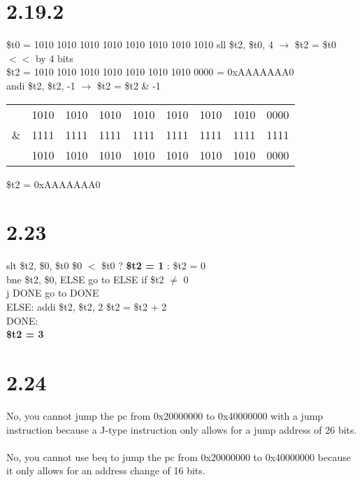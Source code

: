 \documentclass[12pt]{article}
\begin{document}
\section*{2.19.2}
\$t0 = 1010 1010 1010 1010 1010 1010 1010 1010
\newline
\newline
sll \$t2, \$t0, 4 $\rightarrow$ \$t2 = \$t0 $<<$ by 4 bits\\
\$t2 = 1010 1010 1010 1010 1010 1010 1010 0000 = 0xAAAAAAA0\\
\newline
andi \$t2, \$t2, -1 $\rightarrow$ \$t2 = \$t2 \& -1
\newline
\newline
\begin{tabular}{ccccccccc}
	 & 1010 & 1010 & 1010 & 1010 & 1010 & 1010 & 1010 & 0000\\
	\& & 1111 & 1111 & 1111 & 1111 & 1111 & 1111 & 1111 & 1111 \\
	\hline
	& 1010 & 1010 & 1010 & 1010 & 1010 & 1010 & 1010 & 0000\\
\end{tabular}
\newline
\newline
\$t2 = 0xAAAAAAA0

\section*{2.23}
 slt \$t2, \$0, \$t0 \hspace{22mm} \$0 $<$ \$t0 ? \textbf{\$t2 = 1} : \$t2 = 0\\
 bne \$t2, \$0, ELSE \hspace{15mm} go to ELSE if \$t2 $\neq$ 0\\
 j DONE \hspace{35mm}go to DONE\\
 ELSE: addi \$t2, \$t2, 2 \hspace{8mm} \$t2 = \$t2 + 2\\
 DONE:\\
 \newline
 \textbf{\$t2 = 3}
 
 \section*{2.24}
 No, you cannot jump the pc from 0x20000000 to 0x40000000 with a jump instruction because a J-type instruction 
 only allows for a jump address of 26 bits.\\
 \\
 No, you cannot use beq to jump the pc from 0x20000000 to 0x40000000 because it only allows for an address change of 16 bits.\\
 
\end{document}
